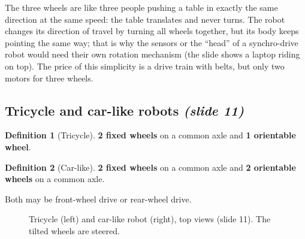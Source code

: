 \documentclass[11pt,a4paper]{article}
\newcommand{\fixedwheel}[2]{\begin{scope}[shift={(#1)},rotate=#2]
  \draw[fill=gray!30] (-0.3,-0.07) rectangle (0.3,0.07);\end{scope}}
\newcommand{\orientwheel}[2]{\begin{scope}[shift={(#1)},rotate=#2]
  \draw[pattern=north east lines] (-0.3,-0.07) rectangle (0.3,0.07);
  \fill (0,0) circle (1pt);\end{scope}}
\newcommand{\wheel}[3]{\begin{scope}[shift={#1},rotate=#2]
  \draw[fill=#3,rounded corners=1pt] (-0.4,-0.12) rectangle (0.4,0.12);\end{scope}}
\theoremstyle{definition}
\newtheorem{definition}{Definition}[section]
\theoremstyle{plain}
\theoremstyle{remark}
\begin{document}
\begin{intuition}
The three wheels are like three people pushing a table in exactly the same direction at the same speed: the table translates and never turns. The robot changes its direction of travel by turning all wheels together, but its body keeps pointing the same way; that is why the sensors or the ``head'' of a synchro-drive robot would need their own rotation mechanism (the slide shows a laptop riding on top). The price of this simplicity is a drive train with belts, but only two motors for three wheels.
\end{intuition}

\subsection{Tricycle and car-like robots \emph{(slide 11)}}

\begin{definition}[Tricycle]
\textbf{2 fixed wheels} on a common axle and \textbf{1 orientable wheel}.
\end{definition}
\begin{definition}[Car-like]
\textbf{2 fixed wheels} on a common axle and \textbf{2 orientable wheels} on a common axle.
\end{definition}
Both may be front-wheel drive or rear-wheel drive.

\begin{figure}[H]
\centering
{}
\caption{Tricycle (left) and car-like robot (right), top views (slide 11). The tilted wheels are steered.}
\end{figure}
\end{document}
